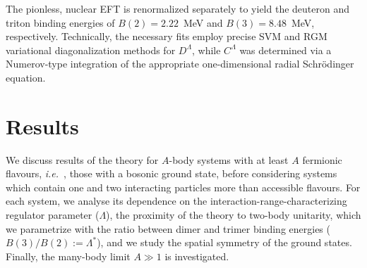 \documentclass[preprint,12pt]{elsarticle}
\newcommand{\lec}{C^\Lambda}
\newcommand{\led}{D^\Lambda}
\newcommand{\ie}{\textit{i.e.}~}
\begin{document}
The pionless, nuclear EFT is renormalized separately to yield the deuteron and triton binding energies of $B(2)=2.22$~MeV
and $B(3)=8.48$~MeV, respectively. 
Technically, the necessary fits employ precise SVM and RGM variational diagonalization methods for $\led$,
while $\lec$ was determined via a Numerov-type integration of the appropriate one-dimensional radial
Schr\"odinger equation.

\section{Results}

We discuss results of the theory for $A$-body systems with at least $A$ fermionic
flavours, \ie, those with a bosonic ground state, before considering systems
which contain one and two interacting particles more than accessible flavours.
For each system, we analyse its dependence on the interaction-range-characterizing
regulator parameter ($\Lambda$), the proximity of the theory to two-body unitarity, which we parametrize with the ratio between dimer and trimer binding energies
($B(3)/B(2):=\Lambda^*$), and we study the spatial symmetry of the ground states.
Finally, the many-body limit $A\gg1$ is investigated.
\end{document}
